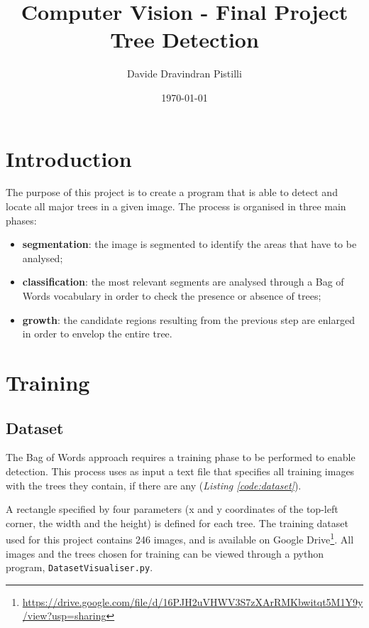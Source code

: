 \documentclass{article}
\title{Computer Vision - Final Project \\ Tree Detection} %
\author{Davide Dravindran Pistilli} %
\date{\today} %
\begin{document}
\maketitle %

\section{Introduction}
The purpose of this project is to create a program that is able to detect and locate all major trees in a given image. The process is organised in three main phases:
\begin{itemize}
\item \textbf{segmentation}: the image is segmented to identify the areas that have to be analysed;
\item \textbf{classification}: the most relevant segments are analysed through a Bag of Words vocabulary in order to check the presence or absence of trees;
\item \textbf{growth}: the candidate regions resulting from the previous step are enlarged in order to envelop the entire tree.
\end{itemize}

\section{Training}
\subsection{Dataset}
The Bag of Words approach requires a training phase to be performed to enable detection. This process uses as input a text file that specifies all training images with the trees they contain, if there are any (\textit{Listing \ref{code:dataset}}).

\lstset{style=DatasetConfig}


A rectangle specified by four parameters (x and y coordinates of the top-left corner, the width and the height) is defined for each tree.
The training dataset used for this project contains 246 images, and is available on Google Drive\footnote{\url{https://drive.google.com/file/d/16PJH2uVHWV3S7zXArRMKbwitqt5M1Y9y/view?usp=sharing}}.
All images and the trees chosen for training can be viewed through a python program, \texttt{DatasetVisualiser.py}.
\end{document}
